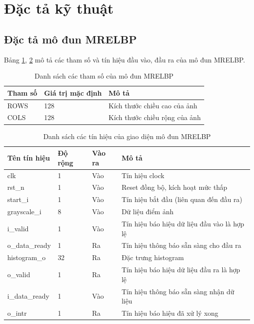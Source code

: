 \section{ Đặc tả kỹ thuật}



\subsection{Đặc tả mô đun MRELBP}

Bảng \ref{tab:paramListMRELBP}, \ref{tab:signalListMRELBP} mô tả các tham số và tín hiệu đầu vào, đầu ra của mô đun MRELBP. 
\begin{table}[h]
    \centering
    \renewcommand{\arraystretch}{1.3} %
    \begin{tabular}{|p{3cm} p{4cm} p{8cm}|}
        \hline
        \rowcolor{gray!30}
        \textbf{Tham số } & \textbf{Giá trị mặc định}  & \textbf{Mô tả} \\
        \hline
        ROWS & 128 & Kích thước chiều cao của ảnh
        \\ \hline
        COLS & 128 & Kích thước chiều rộng của ảnh
        \\ \hline
    \end{tabular}
    \caption{Danh sách các tham số của mô đun MRELBP }
    \label{tab:paramListMRELBP}
\end{table}

\begin{table}[h]
    \centering
    \renewcommand{\arraystretch}{1.3} %
    \begin{tabular}{|p{3cm} p{2cm} p{2cm} p{8cm}|}
        \hline
        \rowcolor{gray!30}
        \textbf{Tên tín hiệu} & \textbf{Độ rộng} & \textbf{Vào ra} & \textbf{Mô tả} \\
        \hline
        clk & 1 & Vào & Tín hiệu clock \\
        \hline
        rst\_n & 1 & Vào & Reset đồng bộ, kích hoạt mức thấp \\
        \hline
        start\_i & 1 & Vào & Tín hiệu bắt đầu (liên quan đến đầu ra)
        \\ \hline
        grayscale\_i & 8 & Vào & Dữ liệu điểm ảnh 
        \\ \hline
        i\_valid & 1 & Vào & Tín hiệu báo hiệu dữ liệu đầu vào là hợp lệ
        \\ \hline
        o\_data\_ready & 1 & Ra & Tín hiệu thông báo sẵn sàng cho đầu ra
        \\ \hline
        histogram\_o & 32 & Ra & Đặc trưng histogram
        \\ \hline
        o\_valid & 1 & Ra & Tín hiệu báo hiệu dữ liệu đầu ra là hợp lệ
        \\ \hline
        i\_data\_ready & 1 & Vào & Tín hiệu thông báo sẵn sàng nhận dữ liệu
        \\ \hline
        o\_intr & 1 & Ra &Tín hiệu báo hiệu đã xử lý xong
        \\ \hline
    \end{tabular}
    \caption{Danh sách các tín hiệu của giao diện mô đun MRELBP}
    \label{tab:signalListMRELBP}
\end{table}


